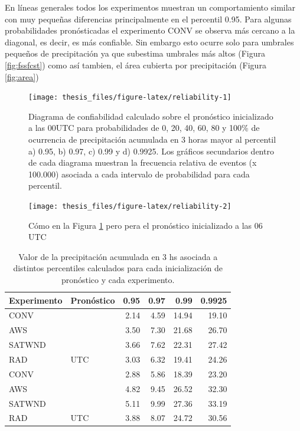 \documentclass[12pt,oneside]{reedthesis}
\begin{document}
En líneas generales todos los experimentos muestran un comportamiento similar con muy pequeñas diferencias principalmente en el percentil 0.95. Para algunas probabilidades pronósticadas el experimento CONV se observa más cercano a la diagonal, es decir, es más confiable. Sin embargo esto ocurre solo para umbrales pequeños de precipitación ya que subestima umbrales más altos (Figura \ref{fig:fssfcst}) como así tambien, el área cubierta por precipitación (Figura \ref{fig:area})




\begin{figure}

{\centering \texttt{[image: thesis\_files/figure-latex/reliability-1]} 

}

\caption{Diagrama de confiabilidad calculado sobre el pronóstico inicializado a las 00UTC para probabilidades de 0, 20, 40, 60, 80 y 100\% de ocurrencia de precipitación acumulada en 3 horas mayor al percentil a) 0.95, b) 0.97, c) 0.99 y d) 0.9925. Los gráficos secundarios dentro de cada diagrama muestran la frecuencia relativa de eventos (x 100.000) asociada a cada intervalo de probabilidad para cada percentil.}\label{fig:reliability-1}
\end{figure}
\begin{figure}

{\centering \texttt{[image: thesis\_files/figure-latex/reliability-2]} 

}

\caption{Cómo en la Figura \ref{fig:reliability-1} pero pera el pronóstico inicializado a las 06 UTC}\label{fig:reliability-2}
\end{figure}
\begin{table}

\caption{\label{tab:quantiles}Valor de la precipitación acumulada en 3 hs asociada a distintos percentiles calculados para cada inicialización de pronóstico y cada experimento.}
\centering
\fontsize{10}{12}\selectfont
\begin{tabular}[t]{llrrrr}
\toprule
Experimento & Pronóstico & 0.95 & 0.97 & 0.99 & 0.9925\\
\midrule
CONV &  & 2.14 & 4.59 & 14.94 & 19.10\\
\cmidrule{1-1}
\cmidrule{3-6}
AWS &  & 3.50 & 7.30 & 21.68 & 26.70\\
\cmidrule{1-1}
\cmidrule{3-6}
SATWND &  & 3.66 & 7.62 & 22.31 & 27.42\\
\cmidrule{1-1}
\cmidrule{3-6}
RAD & \multirow{-4}{*}{\raggedright\arraybackslash 00 UTC} & 3.03 & 6.32 & 19.41 & 24.26\\
\cmidrule{1-6}
CONV &  & 2.88 & 5.86 & 18.39 & 23.20\\
\cmidrule{1-1}
\cmidrule{3-6}
AWS &  & 4.82 & 9.45 & 26.52 & 32.30\\
\cmidrule{1-1}
\cmidrule{3-6}
SATWND &  & 5.11 & 9.99 & 27.36 & 33.19\\
\cmidrule{1-1}
\cmidrule{3-6}
RAD & \multirow{-4}{*}{\raggedright\arraybackslash 06 UTC} & 3.88 & 8.07 & 24.72 & 30.56\\
\bottomrule
\end{tabular}
\end{table}
\end{document}
